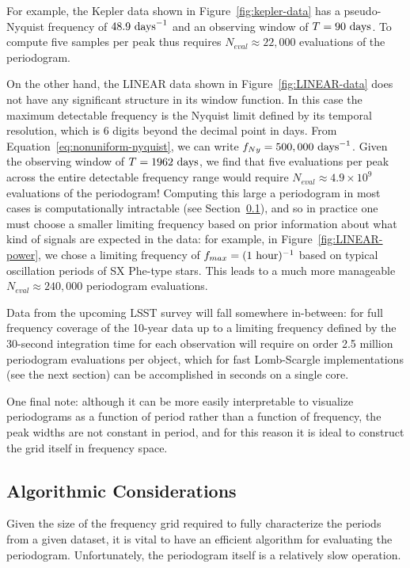 \documentclass[preprint]{aastex}
\newcommand{\fig}[1]{Figure~\ref{fig:#1}}
\newcommand{\Eq}[1]{Equation~\ref{eq:#1}}
\newcommand{\eq}[1]{\Eq{#1}}
\newcommand{\Sect}[1]{Section~\ref{sect:#1}}
\newcommand{\sect}[1]{\Sect{#1}}
\newcommand{\sectlabel}[1]{\label{sect:#1}}
\begin{document}
For example, the Kepler data shown in \fig{kepler-data} has a pseudo-Nyquist
frequency of $48.9\ {\rm days}^{-1}$ and
an observing window of $T = 90\ {\rm days}$.
To compute five samples per peak thus requires $N_{eval} \approx 22,000$
evaluations of the periodogram.

On the other hand, the LINEAR data shown in \fig{LINEAR-data} does not have
any significant structure in its window function.
In this case the maximum detectable frequency is the Nyquist limit defined
by its temporal resolution, which is 6 digits beyond the decimal point in days.
From \eq{nonuniform-nyquist}, we can write $f_{Ny} = 500,000\ {\rm days}^{-1}$.
Given the observing window of $T = 1962\ {\rm days}$, we find that five
evaluations per peak across the entire detectable frequency range
would require $N_{eval} \approx 4.9 \times 10^9$ evaluations of the periodogram!
Computing this large a periodogram in most cases is computationally intractable
(see \sect{algorithmic-considerations}), and so in practice one must choose
a smaller limiting frequency based on prior information about what kind of
signals are expected in the data: for example, in \fig{LINEAR-power}, we chose
a limiting frequency of $f_{max} = (1\ {\rm hour})^{-1}$ based on typical
oscillation periods of SX Phe-type stars. This leads to a much more manageable
$N_{eval} \approx 240,000$ periodogram evaluations.

Data from the upcoming LSST survey \citep{Ivezic08LSST} will fall somewhere
in-between: for full frequency coverage of
the 10-year data up to a limiting frequency defined by the 30-second
integration time for each observation will require on order 2.5 million
periodogram evaluations per object, which for fast Lomb-Scargle implementations
(see the next section) can be accomplished in seconds on a single core.

One final note: although it can be more easily interpretable to
visualize periodograms as a function of period rather than a function of
frequency, the peak widths are not constant in period, and for this reason
it is ideal to construct the grid itself in frequency space.

\subsection{Algorithmic Considerations}
\sectlabel{algorithmic-considerations}
Given the size of the frequency grid required to fully characterize the periods
from a given dataset, it is vital to have an efficient algorithm for evaluating
the periodogram. Unfortunately, the periodogram itself is a relatively slow
operation.
\end{document}
